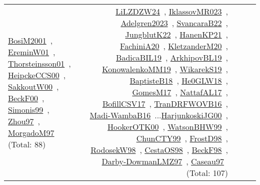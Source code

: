 {\begin{longtable}{p{3cm}r>{\raggedright\arraybackslash}p{6cm}>{\raggedright\arraybackslash}p{6cm}>{\raggedright\arraybackslash}p{8cm}}
\href{../works/BosiM2001.pdf}{BosiM2001}~\cite{BosiM2001}, \href{../works/EreminW01.pdf}{EreminW01}~\cite{EreminW01}, \href{../works/Thorsteinsson01.pdf}{Thorsteinsson01}~\cite{Thorsteinsson01}, \href{../works/HeipckeCCS00.pdf}{HeipckeCCS00}~\cite{HeipckeCCS00}, \href{../works/SakkoutW00.pdf}{SakkoutW00}~\cite{SakkoutW00}, \href{../works/BeckF00.pdf}{BeckF00}~\cite{BeckF00}, \href{../works/Simonis99.pdf}{Simonis99}~\cite{Simonis99}, \href{../works/Zhou97.pdf}{Zhou97}~\cite{Zhou97}, \href{../works/MorgadoM97.pdf}{MorgadoM97}~\cite{MorgadoM97} (Total: 88) & \href{../works/LiLZDZW24.pdf}{LiLZDZW24}~\cite{LiLZDZW24}, \href{../works/IklassovMR023.pdf}{IklassovMR023}~\cite{IklassovMR023}, \href{../works/Adelgren2023.pdf}{Adelgren2023}~\cite{Adelgren2023}, \href{../works/SvancaraB22.pdf}{SvancaraB22}~\cite{SvancaraB22}, \href{../works/JungblutK22.pdf}{JungblutK22}~\cite{JungblutK22}, \href{../works/HanenKP21.pdf}{HanenKP21}~\cite{HanenKP21}, \href{../works/FachiniA20.pdf}{FachiniA20}~\cite{FachiniA20}, \href{../works/KletzanderM20.pdf}{KletzanderM20}~\cite{KletzanderM20}, \href{../works/BadicaBIL19.pdf}{BadicaBIL19}~\cite{BadicaBIL19}, \href{../works/ArkhipovBL19.pdf}{ArkhipovBL19}~\cite{ArkhipovBL19}, \href{../works/KonowalenkoMM19.pdf}{KonowalenkoMM19}~\cite{KonowalenkoMM19}, \href{../works/WikarekS19.pdf}{WikarekS19}~\cite{WikarekS19}, \href{../works/BaptisteB18.pdf}{BaptisteB18}~\cite{BaptisteB18}, \href{../works/He0GLW18.pdf}{He0GLW18}~\cite{He0GLW18}, \href{../works/GomesM17.pdf}{GomesM17}~\cite{GomesM17}, \href{../works/NattafAL17.pdf}{NattafAL17}~\cite{NattafAL17}, \href{../works/BofillCSV17.pdf}{BofillCSV17}~\cite{BofillCSV17}, \href{../works/TranDRFWOVB16.pdf}{TranDRFWOVB16}~\cite{TranDRFWOVB16}, \href{../works/Madi-WambaB16.pdf}{Madi-WambaB16}~\cite{Madi-WambaB16}...\href{../works/HarjunkoskiJG00.pdf}{HarjunkoskiJG00}~\cite{HarjunkoskiJG00}, \href{../works/HookerOTK00.pdf}{HookerOTK00}~\cite{HookerOTK00}, \href{../works/WatsonBHW99.pdf}{WatsonBHW99}~\cite{WatsonBHW99}, \href{../works/ChunCTY99.pdf}{ChunCTY99}~\cite{ChunCTY99}, \href{../works/FrostD98.pdf}{FrostD98}~\cite{FrostD98}, \href{../works/RodosekW98.pdf}{RodosekW98}~\cite{RodosekW98}, \href{../works/CestaOS98.pdf}{CestaOS98}~\cite{CestaOS98}, \href{../works/BeckF98.pdf}{BeckF98}~\cite{BeckF98}, \href{../works/Darby-DowmanLMZ97.pdf}{Darby-DowmanLMZ97}~\cite{Darby-DowmanLMZ97}, \href{../works/Caseau97.pdf}{Caseau97}~\cite{Caseau97} (Total: 107)\\

\end{longtable}}
